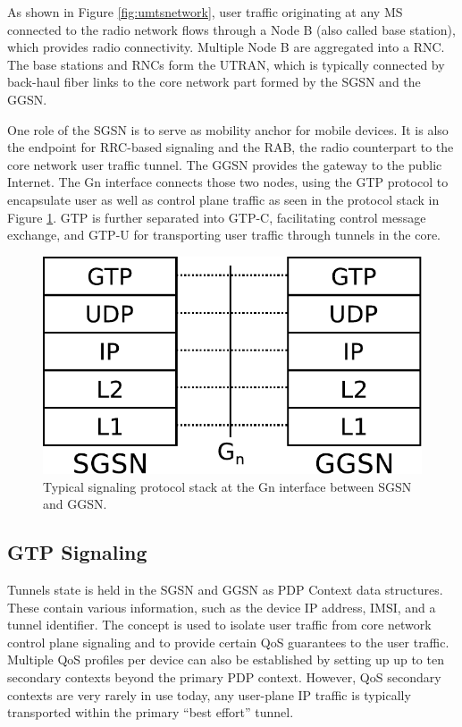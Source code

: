 As shown in Figure \ref{fig:umtsnetwork}, user traffic originating at any \ac{MS} connected to the radio network flows through a Node B (also called base station), which provides radio connectivity. Multiple Node B are aggregated into a \ac{RNC}. The base stations and \acp{RNC} form the \ac{UTRAN}, which is typically connected by back-haul fiber links to the core network part formed by the \ac{SGSN} and the \ac{GGSN}.

One role of the \ac{SGSN} is to serve as mobility anchor for mobile devices. It is also the endpoint for \ac{RRC}-based signaling and the \ac{RAB}, the radio counterpart to the core network user traffic tunnel. The \ac{GGSN} provides the gateway to the public Internet. The Gn interface connects those two nodes, using the \ac{GTP} protocol to encapsulate user as well as control plane traffic as seen in the protocol stack in Figure \ref{fig:signallingstack}. \ac{GTP} is further separated into GTP-C, facilitating control message exchange, and GTP-U for transporting user traffic through tunnels in the core.

\begin{figure}
	\centering
	\includegraphics[width=0.6\columnwidth]{images/IMC2013/signalling-stack.pdf}
	\caption{Typical signaling protocol stack at the Gn interface between \ac{SGSN} and \ac{GGSN}.}
	\label{fig:signallingstack}
\end{figure}


\subsection{GTP Signaling}

Tunnels state is held in the \ac{SGSN} and \ac{GGSN} as \ac{PDP} Context data structures. These contain various information, such as the device IP address, \ac{IMSI}, and a tunnel identifier. The concept is used to isolate user traffic from core network control plane signaling and to provide certain \ac{QoS} guarantees to the user traffic. Multiple \ac{QoS} profiles per device can also be established by setting up up to ten secondary contexts beyond the primary PDP context. However, \ac{QoS} secondary contexts are very rarely in use today, any user-plane IP traffic is typically transported within the primary ``best effort'' tunnel.

